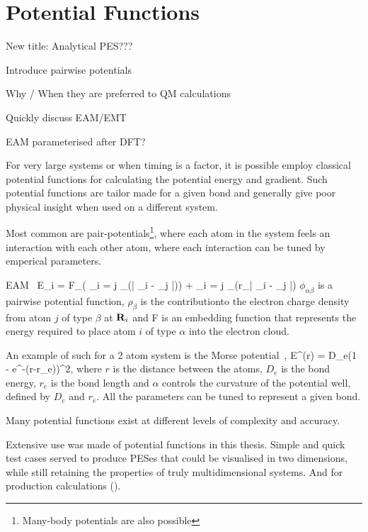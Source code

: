 \section{Potential Functions}
\label{sec:potentials}

\bit
\item New title: Analytical PES???
\item Introduce pairwise potentials
\item Why / When they are preferred to QM calculations
\item Quickly discuss EAM/EMT
\item EAM parameterised after DFT?
\eit

For very large systems or when timing is a factor, it is possible employ classical potential functions for calculating the potential energy and gradient.
Such potential functions are tailor made for a given bond and generally give poor physical insight when used on a different system.

Most common are pair-potentials\footnote{Many-body potentials are also possible}, where each atom in the system feels an interaction with each other atom, where each interaction can be tuned by emperical parameters.

EAM~\cite{eam-1983}
E_i = F_\alpha \left( \sum_{i \not= j} \rho_\beta(\left| \vR_i - \vR_j \right|)\right) +  \sum_{i \not= j} \phi_{\alpha\beta}(r_{\left| \vR_i - \vR_j \right|})
\eeq
$\phi_{\alpha\beta}$ is a pairwise potential function, $\rho_\beta$ is the contributionto the electron charge density from atom $j$ of type $\beta$ at ${\mathrm{\mathbf{\bm{R}}}}_i$ and F is an embedding function that represents the energy required to place atom $i$ of type $\alpha$ into the electron cloud.

An example of such for a 2 atom system is the Morse potential~\cite{morse-1929},
E^(r) = D_e(1 - e^{-\alpha(r-r_e)})^2,
\eeq
where $r$ is the distance between the atoms, $D_e$ is the bond energy, $r_e$ is the bond length and $\alpha$ controls the curvature of the potential well, defined by $D_e$ and $r_e$.
All the parameters can be tuned to represent a given bond.

Many potential functions exist at different levels of complexity and accuracy.

Extensive use was made of potential functions in this thesis.
Simple and quick test cases served to produce PESes that could be visualised in two dimensions, while still retaining the properties of truly multidimensional systems.
And for production calculations ().

